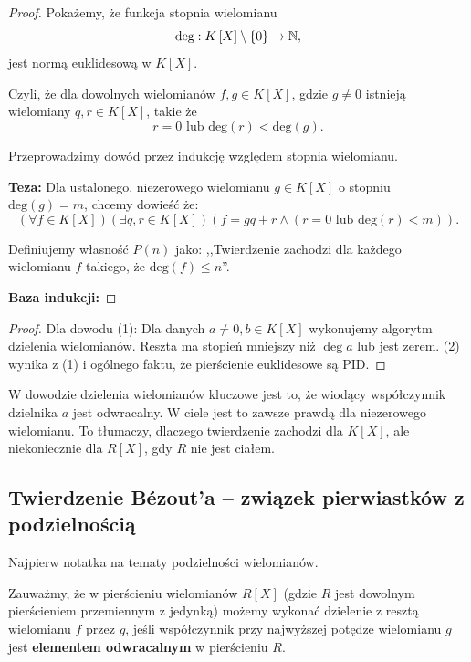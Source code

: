 \begin{proof}
	Pokażemy, że funkcja stopnia wielomianu
	\[
	\text{deg} : K\left[ X \right]\setminus \{0\}  \to \mathbb{N}
	,\] 
	jest normą euklidesową w $K\left[ X \right] $.

	Czyli, że dla dowolnych wielomianów $f,g \in K\left[ X \right] $, gdzie $g\neq 0$ istnieją wielomiany $q,r \in K\left[ X \right] $, takie że
	\[
	r = 0 \text{ lub } \text{deg}\left(r\right) < \text{deg}\left(g\right) 
	.\] 

	Przeprowadzimy dowód przez indukcję względem stopnia wielomianu.

\noindent \textbf{Teza:} Dla ustalonego, niezerowego wielomianu $g \in K\left[ X \right] $ o stopniu $\text{deg}\left(g\right) = m$, chcemy dowieść że:
\[
\left(\forall f \in K\left[ X \right]  \right)\left(\exists q,r \in K\left[ X \right]  \right)\left( f = gq + r \land \left( r = 0 \text{ lub } \text{deg}\left(r\right) < m \right) \right)   
.\] 

Definiujemy własność $P\left( n \right)$ jako: ,,Twierdzenie zachodzi dla każdego wielomianu $f$ takiego, że $\text{deg}\left(f\right) \le n$''.

\noindent \textbf{Baza indukcji:}  


\end{proof} 

\begin{proof}
Dla dowodu (1): Dla danych $a \neq 0, b \in K[X]$ wykonujemy algorytm dzielenia wielomianów. Reszta ma stopień mniejszy niż $\deg a$ lub jest zerem.
(2) wynika z (1) i ogólnego faktu, że pierścienie euklidesowe są PID.
\end{proof}

\begin{remark}
W dowodzie dzielenia wielomianów kluczowe jest to, że wiodący współczynnik dzielnika $a$ jest odwracalny. W ciele jest to zawsze prawdą dla niezerowego wielomianu. To tłumaczy, dlaczego twierdzenie zachodzi dla $K[X]$, ale niekoniecznie dla $R[X]$, gdy $R$ nie jest ciałem.
\end{remark}

\subsection*{Twierdzenie Bézout'a – związek pierwiastków z podzielnością}

\noindent Najpierw notatka na tematy podzielności wielomianów.

Zauważmy, że w pierścieniu wielomianów $R\left[ X \right] $ (gdzie $R$ jest dowolnym pierścieniem przemiennym z jedynką) możemy wykonać dzielenie z resztą wielomianu $f$ przez $g$, jeśli współczynnik przy najwyższej potędze wielomianu $g$ jest \textbf{elementem odwracalnym} w pierścieniu $R$.

